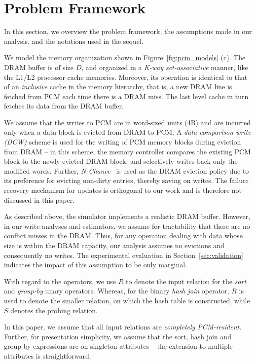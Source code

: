 \section{Problem Framework}
\label{sec:framework}
In this section, we overview the problem framework, the assumptions made
in our analysis, and the notations used in the sequel.

We model the \model{} memory organization shown in Figure~\ref{fig:pcm_models} (c). 
The DRAM buffer is of size $D$, and organized in a \emph{K-way
set-associative} manner, like the L1/L2 processor cache memories. Moreover,
its operation is identical to that of an \emph{inclusive} cache in the
memory hierarchy, that is, a new DRAM line is fetched from PCM each time there
is a DRAM miss. The last level cache in turn fetches its data from the
DRAM buffer.

We assume that the writes to PCM are in word-sized units (4B) and are incurred only when a data block is evicted from DRAM to PCM. A \textit{data-comparison write (DCW)} scheme \cite{write} is used for
the writing of PCM memory blocks during eviction from DRAM -- in this
scheme, the memory controller compares the existing PCM block to the newly
evicted DRAM block, and selectively writes back only the modified words.
Further, \textit{N-Chance}~\cite{nchance} is used as the DRAM eviction
policy due to its preference for evicting non-dirty entries, thereby
saving on writes. The failure recovery mechanism for updates is orthogonal to our work and is therefore not discussed in this paper.

As described above, the simulator implements a realistic DRAM
buffer. However, in our write analyses and estimators, we assume for
tractability that there are no conflict misses in the DRAM. Thus, for
any operation dealing with data whose size is within the DRAM capacity,
our analysis assumes no evictions and consequently no writes. The experimental
evaluation in Section~\ref{sec:validation} indicates the 
impact of this assumption to be only marginal.

With regard to the operators, we use $R$ to denote the input relation
for the \textit{sort} and \textit{group-by} unary operators.  Whereas,
for the binary \textit{hash join} operator, $R$ is used to denote the
smaller relation, on which the hash table is constructed, while $S$
denotes the probing relation. 

In this paper, we assume that all input relations are \emph{completely PCM-resident}.
Further, for presentation simplicity, we assume that the sort,
hash join and group-by expressions are on singleton attributes --
the extension to multiple attributes is straightforward.

